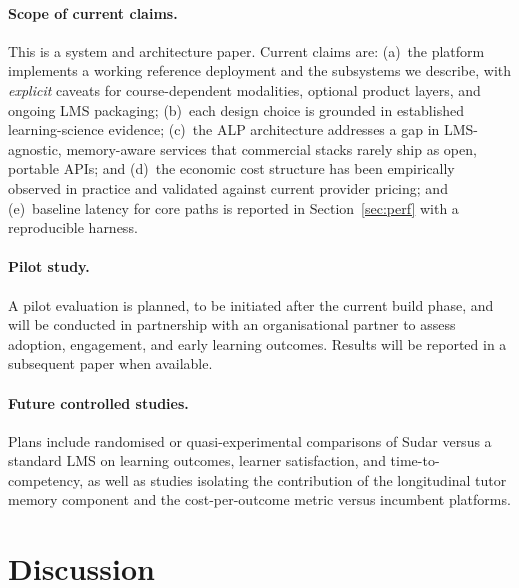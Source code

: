 \documentclass[10pt,twocolumn]{article}
\begin{document}
\paragraph{Scope of current claims.}
This is a system and architecture paper. Current claims are:
(a)~the platform implements a working reference deployment and the
subsystems we describe, with \emph{explicit} caveats for
course-dependent modalities, optional product layers, and ongoing LMS
packaging; (b)~each design choice is grounded in established
learning-science evidence; (c)~the ALP architecture addresses a gap in
LMS-agnostic, memory-aware services that commercial stacks rarely ship
as open, portable APIs; and
(d)~the economic cost structure has been empirically observed in
practice and validated against current provider pricing; and
(e)~baseline latency for core paths is reported in
Section~\ref{sec:perf} with a reproducible harness.

\paragraph{Pilot study.}
A pilot evaluation is planned, to be initiated after the current build
phase, and will be conducted in partnership with an organisational
partner to assess adoption, engagement, and early learning outcomes.
Results will be reported in a subsequent paper when available.

\paragraph{Future controlled studies.}
Plans include randomised or quasi-experimental comparisons of Sudar
versus a standard LMS on learning outcomes, learner satisfaction, and
time-to-competency, as well as studies isolating the contribution of
the longitudinal tutor memory component and the cost-per-outcome metric
versus incumbent platforms.

\section{Discussion}
\label{sec:discussion}
\end{document}
